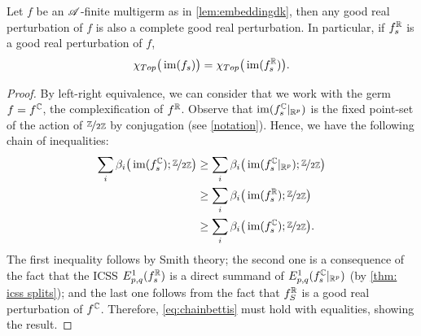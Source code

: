 \documentclass[a4paper,12pt]{amsart}
\begin{document}
\begin{corollary}\label{cor:GRPisCGRP}
Let $f$ be an $\mathscr{A}$-finite multigerm as in \cref{lem:embeddingdk}, then any good real perturbation of $f$ is also a complete good real perturbation. In particular, if $f_s^{\mathbb{R}}$ is a good real perturbation of $f$,
\[ \chi_{Top}\big(\operatorname{im}(f_s)\big)=\chi_{Top}\big(\operatorname{im}(f_s^{\mathbb{R}})\big).\]
\end{corollary}
\begin{proof}
By left-right equivalence, we can consider that we work with the germ $f=f^{\mathbb{C}}$, the complexification of $f^{\mathbb{R}}$. Observe that $\operatorname{im}(f_s^{\mathbb{C}}\rvert_{\mathbb{R}^p})$ is the fixed point-set of the action of $\nicefrac{\mathbb{Z}}{2\mathbb{Z}}$ by conjugation (see \cref{notation}). Hence, we have the following chain of inequalities:
\begin{equation}\label{eq:chainbettis}
\begin{aligned}
\sum_i \beta_i\big(\operatorname{im}(f^{\mathbb{C}}_s);\nicefrac{\mathbb{Z}}{2\mathbb{Z}}\big)&\geq \sum_i \beta_i\big(\operatorname{im}(f^{\mathbb{C}}_s\rvert_{\mathbb{R}^p});\nicefrac{\mathbb{Z}}{2\mathbb{Z}}\big)\\
&\geq\sum_i \beta_i\big(\operatorname{im}(f^{\mathbb{R}}_s);\nicefrac{\mathbb{Z}}{2\mathbb{Z}}\big)\\
&\geq\sum_i \beta_i\big(\operatorname{im}(f^{\mathbb{C}}_s);\nicefrac{\mathbb{Z}}{2\mathbb{Z}}\big).
\end{aligned}
\end{equation}
The first inequality follows by Smith theory; the second one is a consequence of the fact that the ICSS $E^1_{p,q}(f_s^{\mathbb{R}})$ is a direct summand of $E^1_{p,q}(f_s^{\mathbb{C}}\rvert_{\mathbb{R}^p})$ (by \cref{thm: icss splits}); and the last one follows from the fact that $f_S^{\mathbb{R}}$ is a good real perturbation of $f^{\mathbb{C}}$. Therefore, \cref{eq:chainbettis} must hold with equalities, showing the result.
%
%
\end{proof}
\end{document}
